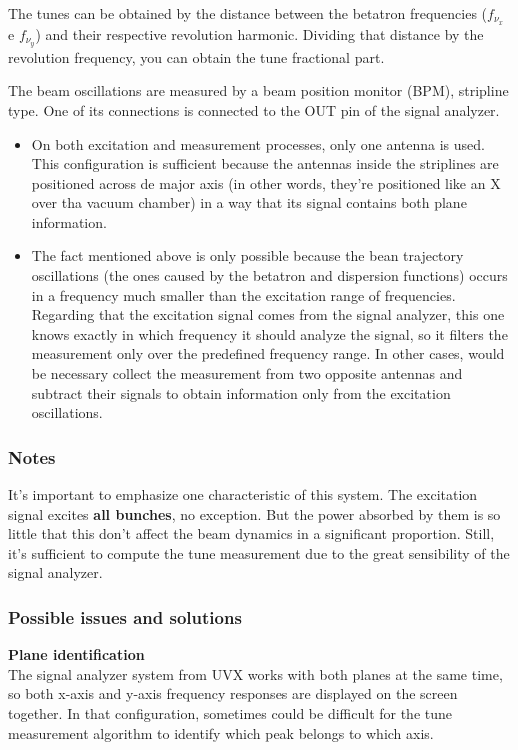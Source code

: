 The tunes can be obtained by the distance between the betatron frequencies ($f_{\nu_x}$ e $f_{\nu_y}$) and their respective revolution harmonic. Dividing that distance by the revolution frequency, you can obtain the tune fractional part.

The beam oscillations are measured by a beam position monitor (BPM), stripline type. One of its connections is connected to the OUT pin of the signal analyzer.

\begin{itemize}
	\item On both excitation and measurement processes, only one antenna is used. This configuration is sufficient because the antennas inside the striplines are positioned across de major axis (in other words, they're positioned like an X over tha vacuum chamber) in a way that its signal contains both plane information.
	\item The fact mentioned above is only possible because the bean trajectory oscillations (the ones caused by the betatron and dispersion functions) occurs in a frequency much smaller than the excitation range of frequencies. Regarding that the excitation signal comes from the signal analyzer, this one knows exactly in which frequency it should analyze the signal, so it filters the measurement only over the predefined frequency range. In other cases, would be necessary collect the measurement from two opposite antennas and subtract their signals to obtain information only from the excitation oscillations.
\end{itemize}

\subsubsection{Notes}
It's important to emphasize one characteristic of this system. The excitation signal excites \textbf{all bunches}, no exception. But the power absorbed by them is so little that this don't affect the beam dynamics in a significant proportion. Still, it's sufficient to compute the tune measurement due to the great sensibility of the signal analyzer.

\subsubsection{Possible issues and solutions}
\noindent
\textbf{Plane identification}\\

The signal analyzer system from UVX works with both planes at the same time, so both x-axis and y-axis frequency responses are displayed on the screen together. In that configuration, sometimes could be difficult for the tune measurement algorithm to identify which peak belongs to which axis.

